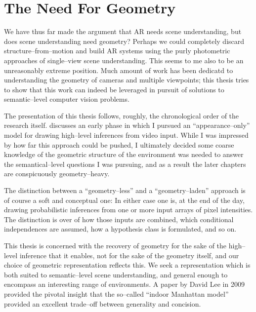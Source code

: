\section{The Need For Geometry}


We have thus far made the argument that AR needs scene understanding,
but does scene understanding need geometry? Perhaps we could
completely discard structure--from--motion and build AR systems using
the purly photometric approaches of single--view scene
understanding. This seems to me also to be an unreasonably extreme
position. Much amount of work has been dedicatd to understanding
the geometry of cameras and multiple viewpoints; this thesis tries to
show that this work can indeed be leveraged in pursuit of solutions to
semantic--level computer vision problems.

The presentation of this thesis follows, roughly, the chronological
order of the research itself.  discusses an
early phase in which I pursued an ``appearance--only'' model for
drawing high--level inferences from video input. While I was impressed
by how far this approach could be pushed, I ultimately decided some
coarse knowledge of the geometric structure of the environment was
needed to answer the semantical--level questions I was pursuing, and
as a result the later chapters are conspicuously geometry--heavy.

The distinction between a ``geometry--less'' and a ``geometry--laden''
approach is of course a soft and conceptual one: In either case one
is, at the end of the day, drawing probabilistic inferences from one
or more input arrays of pixel intensities. The distinction is over of
how those inputs are combined, which conditional independences are
assumed, how a hypothesis class is formulated, and so on.

This thesis is concerned with the recovery of geometry for the sake of
the high--level inference that it enables, not for the sake of the
geometry itself, and our choice of geometric representation reflects
this. We seek a representation which is both suited to semantic--level
scene understanding, and general enough to encompass an interesting
range of environments. A paper by David Lee \cite{Lee09} in 2009
provided the pivotal insight that the so--called ``indoor Manhattan
model'' provided an excellent trade--off between generality and
concision.

